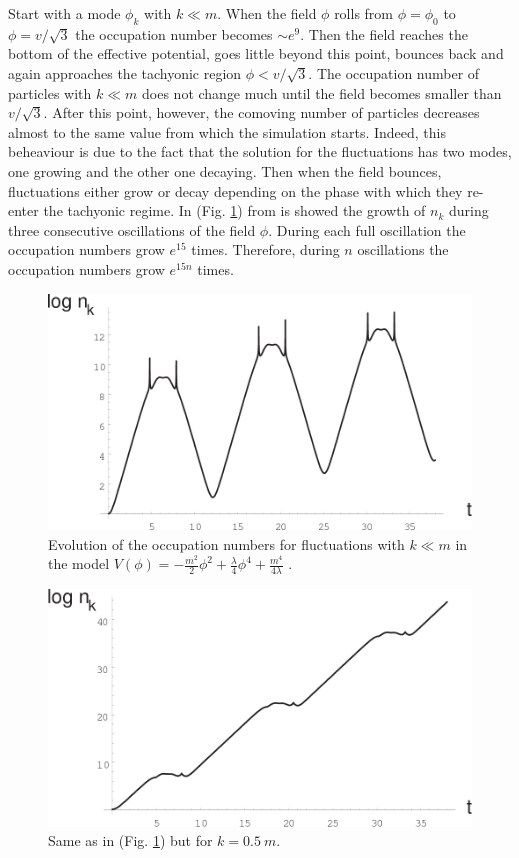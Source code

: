 \documentclass[11pt,a4paper,twoside]{book}
\begin{document}
Start with a mode $\phi_{k}$ with $ k\ll m $. When the field $\phi$ rolls from $\phi=\phi_{0}$ to $\phi=v/\sqrt{3}$ the occupation number becomes $ \sim e^{9} $. Then the field reaches the bottom of the effective potential, goes little beyond this point, bounces back and again approaches the tachyonic region $ \phi < v/\sqrt{3} $. The occupation number of particles with $ k \ll m $ does not change much until the field becomes smaller than $ v/\sqrt{3} $.  After this point, however, the comoving number of particles decreases almost to the same value from which the simulation starts. Indeed, this beheaviour is due to the fact that the solution for the fluctuations has two modes, one growing and the other one decaying. Then when the field bounces, fluctuations either grow or decay depending on the phase with which they re-enter the tachyonic regime. In (Fig. \ref{fig:tachyonicinstabilityfig1}) from \cite{Chap5:TachyonicInstability} is showed the growth of $ n_{k} $ during three consecutive oscillations of the field $\phi$. During each full oscillation the occupation numbers grow $ e^{15} $ times. Therefore, during $ n $ oscillations the occupation numbers grow $ e^{15n} $ times.
\begin{figure}[h]
	\centering
	\includegraphics[width=0.6\linewidth, height=0.25\textheight]{Images/Chap5/TachyonicInstability_Fig1}
	\caption{Evolution of the occupation numbers for fluctuations with $ k\ll m $ in the model $ V(\phi)=-\frac{m^{2}}{2}\phi^{2} + \frac{\lambda}{4}\phi^{4} + \frac{m^{4}}{4\lambda} $ \cite{Chap5:TachyonicInstability}.}
	\label{fig:tachyonicinstabilityfig1}
\end{figure}
\begin{figure}[h]
	\centering
	\includegraphics[width=0.6\linewidth, height=0.25\textheight]{Images/Chap5/TachyonicInstability_Fig2}
	\caption{Same as in (Fig. \ref{fig:tachyonicinstabilityfig1}) but for $ k=0.5\ m $\cite{Chap5:TachyonicInstability}.}
	\label{fig:tachyonicinstabilityfig2}
\end{figure}
\end{document}
